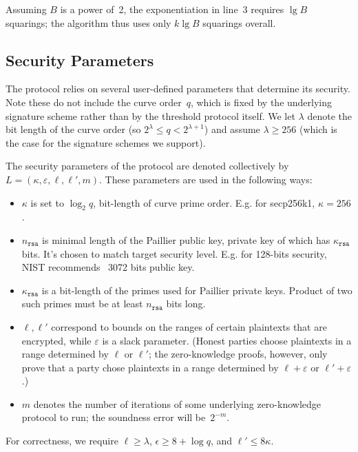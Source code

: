 \documentclass[11pt]{article}
\def\eps{\varepsilon}
\newcommand{\rsa}{\ensuremath{\mathtt{rsa}}}
\newcommand{\?}[1]{\stackrel{?}{#1}}
\begin{document}
\noindent
Assuming $B$ is a power of~2, the exponentiation in line~3 requires $\lg B$ squarings; the algorithm thus uses only $k\lg B$ squarings overall.

\subsection{Security Parameters}
\label{sec:security-params}

The protocol relies on several user-defined parameters that determine its security. Note  these do not include the curve order~$q$, which is fixed by the underlying signature scheme  rather than by the threshold protocol itself.
We let $\lambda$ denote the bit length of the curve order (so $2^\lambda \leq q < 2^{\lambda+1}$) and assume $\lambda\geq 256$ (which is the case for the signature schemes we support).

The security parameters of the protocol are denoted collectively by $L = (\kappa, \varepsilon, \ell, \ell', m)$.
These parameters are used in the following ways:
\begin{itemize}
    \item $\kappa$ is set to $\log_2 q$, bit-length of curve prime order. E.g. for secp256k1, $\kappa = 256$.

    \item $n_\rsa$ is minimal length of the Paillier public key, private key of which has $\kappa_\rsa$ bits. It's chosen to match target security level. E.g. for 128-bits security, NIST recommends~\cite{NIST-RSA-keylen} 3072 bits public key.
    \item $\kappa_\rsa$ is a bit-length of the primes used for Paillier private keys. Product of two such primes must be at least $n_\rsa$ bits long.

    \item $\ell, \ell'$ correspond to bounds on the ranges of certain plaintexts that are encrypted, while %
    $\eps$ is a slack parameter. (Honest parties choose plaintexts in a range determined by $\ell$ or $\ell'$; the zero-knowledge proofs, however, only prove that a party chose plaintexts in a range determined by $\ell+\eps$ or $\ell'+\eps$.)

    \item $m$ denotes the number of iterations of some underlying zero-knowledge protocol to run; the soundness error will be~$2^{-m}$.
\end{itemize}
For correctness, we require
$\ell \geq \lambda$,
    $\epsilon \geq 8 + \log q$, and
    $\ell' \leq 8\kappa$.
\end{document}
